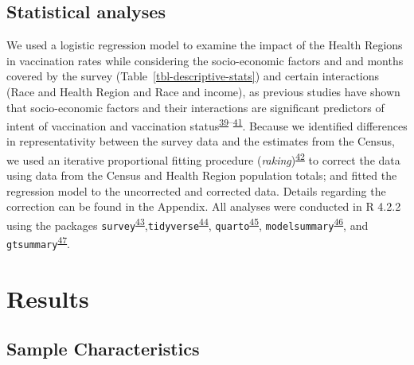 \documentclass[
  letterpaper,
  DIV=11,
  numbers=noendperiod]{scrartcl}
\begin{document}
\hypertarget{statistical-analyses}{%
\subsection{Statistical analyses}\label{statistical-analyses}}

We used a logistic regression model to examine the impact of the Health
Regions in vaccination rates while considering the socio-economic
factors and and months covered by the survey
(Table~\ref{tbl-descriptive-stats}) and certain interactions (Race and
Health Region and Race and income), as previous studies have shown that
socio-economic factors and their interactions are significant predictors
of intent of vaccination and vaccination
status\textsuperscript{\protect\hyperlink{ref-nguyen2022}{39}--\protect\hyperlink{ref-cnat2022a}{41}}.
Because we identified differences in representativity between the survey
data and the estimates from the Census, we used an iterative
proportional fitting procedure
(\emph{raking})\textsuperscript{\protect\hyperlink{ref-deming1940}{42}}
to correct the data using data from the Census and Health Region
population totals; and fitted the regression model to the uncorrected
and corrected data. Details regarding the correction can be found in the
Appendix. All analyses were conducted in R 4.2.2 using the packages
\texttt{survey}\textsuperscript{\protect\hyperlink{ref-lumley2011}{43}},\texttt{tidyverse}\textsuperscript{\protect\hyperlink{ref-wickham2019}{44}},
\texttt{quarto}\textsuperscript{\protect\hyperlink{ref-quarto}{45}},
\texttt{modelsummary}\textsuperscript{\protect\hyperlink{ref-modelsummary}{46}},
and
\texttt{gtsummary}\textsuperscript{\protect\hyperlink{ref-gtsummary}{47}}.

\hypertarget{results}{%
\section{Results}\label{results}}

\hypertarget{sample-characteristics}{%
\subsection{Sample Characteristics}\label{sample-characteristics}}
\end{document}
